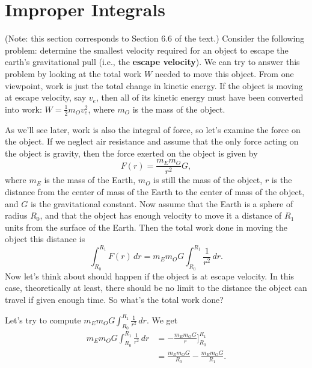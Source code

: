 \documentclass[10pt,]{book}
\newcommand{\terminology}[1]{\textbf{#1}}
\theoremstyle{ptxplainnotitle}
\theoremstyle{ptxplaintitle}
\theoremstyle{ptxplainnotitle}
\theoremstyle{ptxplaintitle}
\theoremstyle{ptxplainnotitle}
\theoremstyle{ptxplaintitle}
\theoremstyle{ptxdefinitionnotitle}
\theoremstyle{ptxdefinitiontitle}
\theoremstyle{ptxdefinitionnotitle}
\theoremstyle{ptxdefinitiontitle}
\theoremstyle{ptxdefinitionnotitle}
\theoremstyle{ptxdefinitiontitle}
\theoremstyle{ptxdefinitionnotitle}
\theoremstyle{ptxdefinitiontitle}
\theoremstyle{ptxdefinitionnotitle}
\theoremstyle{ptxdefinitiontitle}
\numberwithin{equation}{section}
\begin{document}
\section[{Improper Integrals}]{Improper Integrals}\label{section-improper-integrals}
\hypertarget{p-574}{}%
(Note: this section corresponds to Section 6.6 of the text.) Consider the following problem: determine the smallest velocity required for an object to escape the earth's gravitational pull (i.e., the \terminology{escape velocity}). We can try to answer this problem by looking at the total work \(W\) needed to move this object. From one viewpoint, work is just the total change in kinetic energy. If the object is moving at escape velocity, say \(v_{e}\), then all of its kinetic energy must have been converted into work: \(W = \frac{1}{2}m_{O}v_{e}^{2}\), where \(m_{O}\) is the mass of the object.%
\par
\hypertarget{p-575}{}%
As we'll see later, work is also the integral of force, so let's examine the force on the object. If we neglect air resistance and assume that the only force acting on the object is gravity, then the force exerted on the object is given by%
\begin{equation*}
F(r) = \frac{m_{E}m_{O}}{r^{2}}G,
\end{equation*}
where \(m_{E}\) is the mass of the Earth, \(m_{O}\) is still the mass of the object, \(r\) is the distance from the center of mass of the Earth to the center of mass of the object, and \(G\) is the gravitational constant. Now assume that the Earth is a sphere of radius \(R_{0}\), and that the object has enough velocity to move it a distance of \(R_{1}\) units from the surface of the Earth. Then the total work done in moving the object this distance is%
\begin{equation*}
\int_{R_{0}}^{R_{1}}F(r)\,dr = m_{E}m_{O}G\int_{R_{0}}^{R_{1}}\frac{1}{r^{2}}\,dr.
\end{equation*}
Now let's think about should happen if the object is at escape velocity. In this case, theoretically at least, there should be no limit to the distance the object can travel if given enough time. So what's the total work done?%
\par
\hypertarget{p-576}{}%
Let's try to compute \(m_{E}m_{O}G\int_{R_{0}}^{R_{1}}\frac{1}{r^{2}}\,dr.\) We get%
\begin{align*}
m_{E}m_{O}G\int_{R_{0}}^{R_{1}}\frac{1}{r^{2}}\,dr & = -\frac{m_{E}m_{O}G}{r}\big]_{R_{0}}^{R_{1}} \\
& = \frac{m_{E}m_{O}G}{R_{0}} - \frac{m_{E}m_{O}G}{R_{1}}. 
\end{align*}
\end{document}
